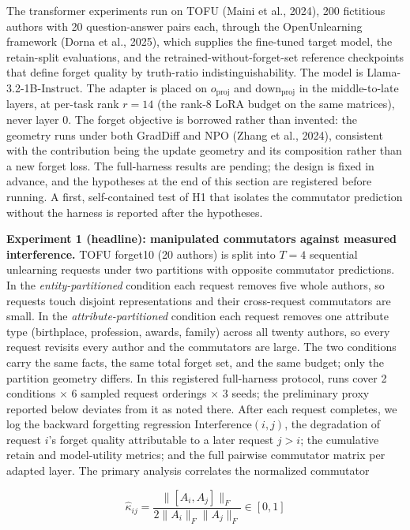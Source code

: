 \documentclass[
]{article}
\begin{document}
The transformer experiments run on TOFU (Maini et al., 2024), 200 fictitious authors with 20 question-answer pairs each, through the OpenUnlearning framework (Dorna et al., 2025), which supplies the fine-tuned target model, the retain-split evaluations, and the retrained-without-forget-set reference checkpoints that define forget quality by truth-ratio indistinguishability. The model is Llama-3.2-1B-Instruct. The adapter is placed on \(o_{\mathrm{proj}}\) and \(\mathrm{down}_{\mathrm{proj}}\) in the middle-to-late layers, at per-task rank \(r=14\) (the rank-8 LoRA budget on the same matrices), never layer 0. The forget objective is borrowed rather than invented: the geometry runs under both GradDiff and NPO (Zhang et al., 2024), consistent with the contribution being the update geometry and its composition rather than a new forget loss. The full-harness results are pending; the design is fixed in advance, and the hypotheses at the end of this section are registered before running. A first, self-contained test of H1 that isolates the commutator prediction without the harness is reported after the hypotheses.

\textbf{Experiment 1 (headline): manipulated commutators against measured interference.} TOFU forget10 (20 authors) is split into \(T=4\) sequential unlearning requests under two partitions with opposite commutator predictions. In the \emph{entity-partitioned} condition each request removes five whole authors, so requests touch disjoint representations and their cross-request commutators are small. In the \emph{attribute-partitioned} condition each request removes one attribute type (birthplace, profession, awards, family) across all twenty authors, so every request revisits every author and the commutators are large. The two conditions carry the same facts, the same total forget set, and the same budget; only the partition geometry differs. In this registered full-harness protocol, runs cover 2 conditions \(\times\) 6 sampled request orderings \(\times\) 3 seeds; the preliminary proxy reported below deviates from it as noted there. After each request completes, we log the backward forgetting regression \(\mathrm{Interference}(i,j)\), the degradation of request \(i\)'s forget quality attributable to a later request \(j>i\); the cumulative retain and model-utility metrics; and the full pairwise commutator matrix per adapted layer. The primary analysis correlates the normalized commutator

\[
\hat{\kappa}_{ij}=\frac{\|[A_i,A_j]\|_F}{2\|A_i\|_F\|A_j\|_F}\in[0,1]
\]
\end{document}
